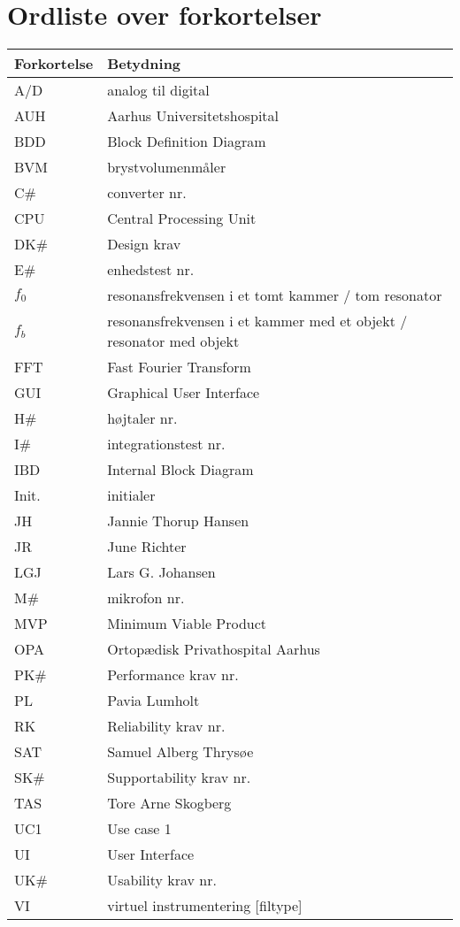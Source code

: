 \section*{Ordliste over forkortelser}

\vspace{1cm}
\begin{table}[hbt]
\centering
\label{ordliste}
\begin{tabular}{|l|l|}
\hline
\textbf{Forkortelse             } & \textbf{Betydning             } \\ \hline
A/D & analog til digital \\ \hline
AUH & Aarhus Universitetshospital \\ \hline
BDD & Block Definition Diagram \\ \hline
BVM & brystvolumenmåler \\ \hline
C\# & converter nr. \\ \hline
CPU & Central Processing Unit \\ \hline
DK\# & Design krav \\ \hline
E\# & enhedstest nr. \\ \hline
$f_{0}$ & resonansfrekvensen i et tomt kammer / tom resonator \\ \hline 
$f_{b}$ & resonansfrekvensen i et kammer med et objekt / resonator med objekt \\ \hline
FFT & Fast Fourier Transform \\ \hline 
GUI & Graphical User Interface \\ \hline
H\# & højtaler nr. \\ \hline
I\# & integrationstest nr. \\ \hline
IBD & Internal Block Diagram \\ \hline 
Init. & initialer \\ \hline 
JH & Jannie Thorup Hansen \\ \hline
JR & June Richter  \\ \hline
LGJ & Lars G. Johansen \\ \hline
M\# & mikrofon nr. \\ \hline
MVP & Minimum Viable Product \\ \hline
OPA & Ortopædisk Privathospital Aarhus \\ \hline
PK\# & Performance krav nr. \\ \hline
PL & Pavia Lumholt \\ \hline
RK & Reliability krav nr. \\ \hline
SAT & Samuel Alberg Thrysøe \\ \hline
SK\# & Supportability krav nr. \\ \hline 
TAS & Tore Arne Skogberg \\ \hline
UC1 & Use case 1 \\ \hline
UI & User Interface \\ \hline
UK\# & Usability krav nr. \\ \hline
VI & virtuel instrumentering [filtype] \\ \hline
\end{tabular}
\end{table}